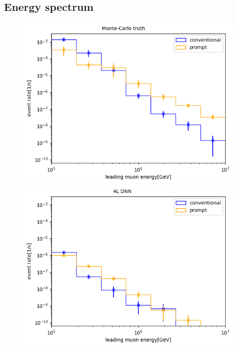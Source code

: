 \documentclass[
  tucolor,       %
  BCOR=12mm,     %
  parskip=half,  %
  open=any,      %
  cleardoublepage=plain,  %
]{tudothesis}
\begin{document}
\subsection{Energy spectrum}
\begin{figure}
  \centering
  \begin{minipage}[t]{0.32\textwidth}
    \includegraphics[width=\textwidth]{Plots/muon flux monte carlo entry}
  \end{minipage}
  \begin{minipage}[t]{0.32\textwidth}
    \includegraphics[width=\textwidth]{Plots/muon flux small dnn entry}
  \end{minipage}
  \begin{minipage}[t]{0.32\textwidth}

\end{minipage}
\end{figure}
\end{document}
